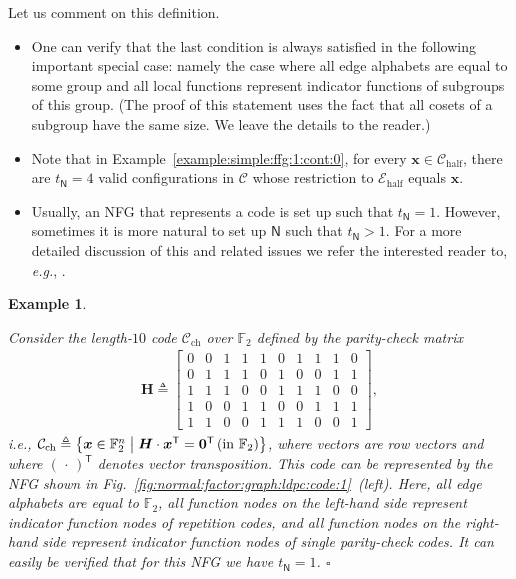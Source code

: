 \documentclass[journal, twocolumn]{IEEEtran}
\renewcommand{\mathbf}[1]{{\bm{#1}}}
\newcommand{\eg}{\emph{e.g.}}
\newcommand{\ie}{\emph{i.e.}}
\newcommand{\matr}[1]{\mathbf{#1}}
\newcommand{\vect}[1]{\mathbf{#1}}
\newcommand{\code}[1]{\mathcal{#1}}
\newcommand{\set}[1]{\mathcal{#1}}
\newcommand{\graph}[1]{\mathsf{#1}}
\newcommand{\GF}[1]{\mathbb{F}_{#1}}
\newcommand{\defeq}{\triangleq}
\newcommand{\codeC}{\code{C}}
\newcommand{\codeCchannel}{\code{C}_{\mathrm{ch}}}
\newcommand{\codeCedgehalf}{\code{C}_{\mathrm{half}}}
\newcommand{\matrH}{\matr{H}}
\newcommand{\setEhalf}{\set{E}_{\mathrm{half}}}
\newcommand{\vx}{\vect{x}}
\newcommand{\tr}{\mathsf{T}}
\newcommand{\graphN}{\graph{N}}
\newcommand{\?}{\mathrm{?}}
\newcommand{\qedwhite}{\hspace*{\fill}%
  $\square$\smallskip}
\newcommand{\exampleend}{\qedwhite}
\newtheorem{Example}[Lemma]{Example}
\begin{document}
\noindent
Let us comment on this definition.
\begin{itemize}

\item One can verify that the last condition is always satisfied in the
  following important special case: namely the case where all edge alphabets
  are equal to some group and all local functions represent indicator
  functions of subgroups of this group. (The proof of this statement uses the
  fact that all cosets of a subgroup have the same size. We leave the details
  to the reader.)

\item Note that in Example~\ref{example:simple:ffg:1:cont:0}, for every $\vx
  \in \codeCedgehalf$, there are $t_{\graphN} = 4$ valid configurations in
  $\codeC$ whose restriction to $\setEhalf$ equals $\vx$.

\item Usually, an NFG that represents a code is set up such that $t_{\graphN}
  = 1$. However, sometimes it is more natural to set up $\graphN$ such that
  $t_{\graphN} > 1$. For a more detailed discussion of this and related issues
  we refer the interested reader to, \eg, \cite{Forney:GluesingLuerssen:12:1}.

\end{itemize}


\begin{Example}
  \label{example:normal:factor:graph:ldpc:code:1}  

  Consider the length-$10$ code $\codeCchannel$ over $\GF{2}$ defined by the
  parity-check matrix
  \begin{align*}
    \matrH
      \defeq
        \begin{bmatrix}
          0 & 0 & 1 & 1 & 1 & 0 & 1 & 1 & 1 & 0 \\
          0 & 1 & 1 & 1 & 0 & 1 & 0 & 0 & 1 & 1 \\
          1 & 1 & 1 & 0 & 0 & 1 & 1 & 1 & 0 & 0 \\
          1 & 0 & 0 & 1 & 1 & 0 & 0 & 1 & 1 & 1 \\
          1 & 1 & 0 & 0 & 1 & 1 & 1 & 0 & 0 & 1
        \end{bmatrix},
  \end{align*}
  \ie, $\codeCchannel \defeq \bigl\{ \vx \in \GF{2}^n \bigm| \matrH
  \cdot \vx^\tr = \vect{0}^\tr \, (\text{in $\GF{2}$}) \bigr\}$, where vectors
  are row vectors and where $(\,\cdot\,)^\tr$ denotes vector
  transposition. This code can be represented by the NFG shown in
  Fig.~\ref{fig:normal:factor:graph:ldpc:code:1}~(left). Here, all edge
  alphabets are equal to $\GF{2}$, all function nodes on the left-hand side
  represent indicator function nodes of repetition codes, and all function
  nodes on the right-hand side represent indicator function nodes of single
  parity-check codes. It can easily be verified that for this NFG we have
  $t_{\graphN} = 1$.  \exampleend
\end{Example}
\end{document}
